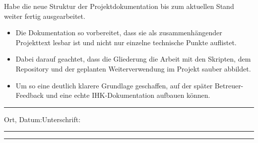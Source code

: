 Habe die neue Struktur der Projektdokumentation bis zum aktuellen Stand weiter fertig ausgearbeitet.

\begin{itemize}
    \item Die Dokumentation so vorbereitet, dass sie als zusammenhängender Projekttext lesbar ist und nicht nur einzelne technische Punkte auflistet.
    \item Dabei darauf geachtet, dass die Gliederung die Arbeit mit den Skripten, dem Repository und der geplanten Weiterverwendung im Projekt sauber abbildet.
    \item Um so eine deutlich klarere Grundlage geschaffen, auf der später Betreuer-Feedback und eine echte IHK-Dokumentation aufbauen können.
\end{itemize}

\vfill
\noindent\rule{\linewidth}{0.2pt}

\noindent Ort, Datum:\hfill Unterschrift:\\[0.5cm]
\noindent \rule{6cm}{0.9pt}\hfill \rule{6cm}{0.9pt}

\restoregeometry
\newpage


\vspace*{-2cm}